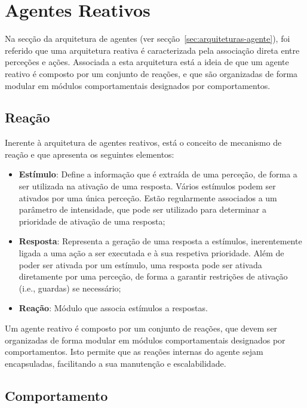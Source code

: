 \section{Agentes Reativos}\label{sec:agentes-reativos}

Na secção da arquitetura de agentes (ver secção~\ref{sec:arquiteturas-agente}), foi referido que uma arquitetura reativa é caracterizada pela associação direta entre perceções e ações.
Associada a esta arquitetura está a ideia de que um agente reativo é composto por um conjunto de reações, e que são organizadas de forma modular em módulos comportamentais designados por comportamentos.

\subsection{Reação}\label{subsec:reacao}

Inerente à arquitetura de agentes reativos, está o conceito de mecanismo de reação e que apresenta os seguintes elementos:

\begin{itemize}
    \item \textbf{Estímulo}: Define a informação que é extraída de uma perceção, de forma a ser utilizada na ativação de uma resposta.
    Vários estímulos podem ser ativados por uma única perceção.
    Estão regularmente associados a um parâmetro de intensidade, que pode ser utilizado para determinar a prioridade de ativação de uma resposta;
    \item \textbf{Resposta}: Representa a geração de uma resposta a estímulos, inerentemente ligada a uma ação a ser executada e à sua respetiva prioridade.
    Além de poder ser ativada por um estímulo, uma resposta pode ser ativada diretamente por uma perceção, de forma a garantir restrições de ativação (i.e., guardas) se necessário;
    \item \textbf{Reação}: Módulo que associa estímulos a respostas.
\end{itemize}

Um agente reativo é composto por um conjunto de reações, que devem ser organizadas de forma modular em módulos comportamentais designados por comportamentos.
Isto permite que as reações internas do agente sejam encapsuladas, facilitando a sua manutenção e escalabilidade.

\subsection{Comportamento}\label{subsec:comportamento}


